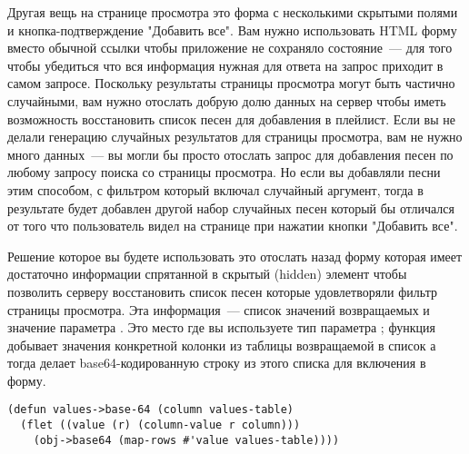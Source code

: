 Другая вещь на странице просмотра это форма с несколькими скрытыми полями  и
кнопка-подтверждение "Добавить все". Вам нужно использовать HTML форму вместо обычной
ссылки чтобы приложение не сохраняло состояние~--- для того чтобы убедиться что вся
информация нужная для ответа на запрос приходит в самом запросе. Поскольку результаты
страницы просмотра могут быть частично случайными, вам нужно отослать добрую долю данных
на сервер чтобы иметь возможность восстановить список песен для добавления в плейлист.
Если вы не делали генерацию случайных результатов для страницы просмотра, вам не нужно
много данных~--- вы могли бы просто отослать запрос для добавления песен по любому запросу
поиска со страницы просмотра. Но если вы добавляли песни этим способом, с фильтром который
включал случайный аргумент, тогда в результате будет добавлен другой набор случайных песен
который бы отличался от того что пользователь видел на странице при нажатии кнопки
"Добавить все".

Решение которое вы будете использовать это отослать назад форму которая имеет достаточно
информации спрятанной в скрытый (hidden) элемент  чтобы позволить серверу
восстановить список песен которые удовлетворяли фильтр страницы просмотра. Эта
информация~--- список значений возвращаемых  и значение параметра
. Это место где вы используете тип параметра ; функция
 добывает значения конкретной колонки из таблицы возвращаемой
 в список а тогда делает base64-кодированную строку из этого списка
для включения в форму.

\begin{lstlisting}
(defun values->base-64 (column values-table)
  (flet ((value (r) (column-value r column)))
    (obj->base64 (map-rows #'value values-table))))
\end{lstlisting}

